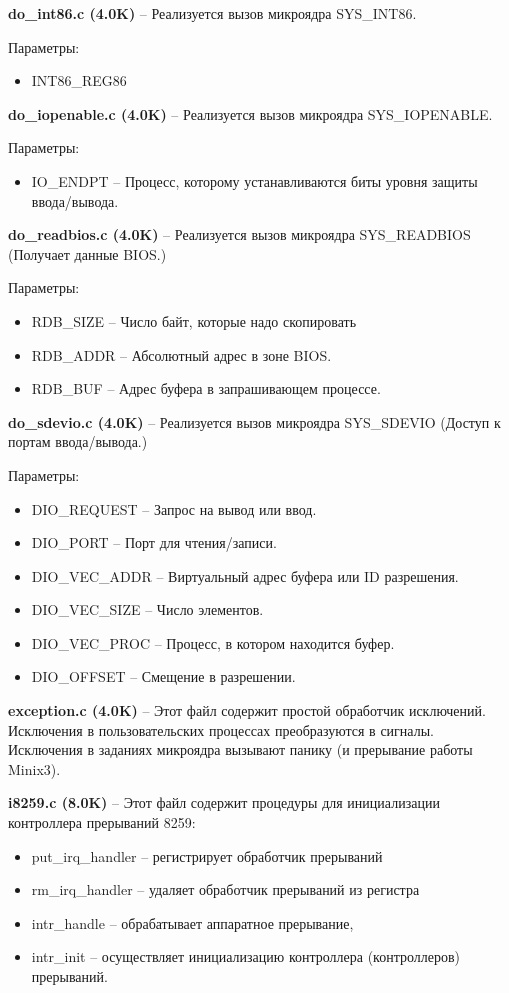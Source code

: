 \textbf{do\_int86.c (4.0K)} -- Реализуется вызов микроядра SYS\_INT86.

Параметры:
\begin{itemize}
\item INT86\_REG86
\end{itemize}

\textbf{do\_iopenable.c (4.0K)} -- Реализуется вызов микроядра SYS\_IOPENABLE.

Параметры:
\begin{itemize}
\item IO\_ENDPT -- Процесс, которому устанавливаются биты уровня защиты ввода/вывода.
\end{itemize}

\textbf{do\_readbios.c (4.0K)} -- Реализуется вызов микроядра SYS\_READBIOS (Получает данные BIOS.)

Параметры:
\begin{itemize}
\item RDB\_SIZE -- Число байт, которые надо скопировать
\item RDB\_ADDR	-- Абсолютный адрес в зоне BIOS.
\item RDB\_BUF -- Адрес буфера в запрашивающем процессе.
\end{itemize}


\textbf{do\_sdevio.c (4.0K)} -- Реализуется вызов микроядра SYS\_SDEVIO (Доступ к портам ввода/вывода.)

Параметры:
\begin{itemize}
\item DIO\_REQUEST -- Запрос на вывод или ввод.
\item DIO\_PORT -- Порт для  чтения/записи.
\item DIO\_VEC\_ADDR -- Виртуальный адрес буфера или ID разрешения.
\item DIO\_VEC\_SIZE -- Число элементов.
\item DIO\_VEC\_PROC -- Процесс, в котором находится буфер.
\item DIO\_OFFSET -- Смещение в разрешении.
\end{itemize}

\textbf{exception.c (4.0K)} -- Этот файл содержит простой обработчик исключений. Исключения в пользовательских процессах преобразуются в сигналы. Исключения в заданиях микроядра вызывают панику (и прерывание работы Minix3).

\textbf{i8259.c (8.0K)} -- Этот файл содержит процедуры для инициализации контроллера прерываний 8259:
\begin{itemize}
\item put\_irq\_handler -- регистрирует обработчик прерываний
\item rm\_irq\_handler -- удаляет обработчик прерываний из регистра
\item intr\_handle -- обрабатывает аппаратное прерывание,
\item intr\_init -- осуществляет инициализацию контроллера (контроллеров) прерываний.
\end{itemize}

